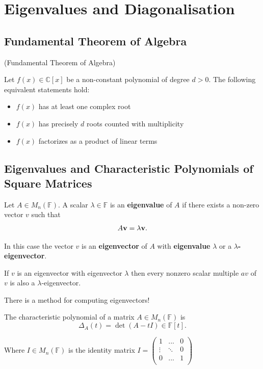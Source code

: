 \section{Eigenvalues and Diagonalisation}

\subsection{Fundamental Theorem of Algebra}
\begin{theorem} (Fundamental Theorem of Algebra)

  Let $f(x) \in \mathbb{C}[x]$ be a non-constant polynomial of degree $d > 0$. The following equivalent statements hold:
  \begin{itemize}
    \item $f(x)$ has at least one complex root
    \item $f(x)$ has precisely $d$ roots counted with multiplicity
    \item $f(x)$ factorizes as a product of linear terms
  \end{itemize}
\end{theorem}

\subsection{Eigenvalues and Characteristic Polynomials of Square Matrices}

\begin{definition}
  Let $A \in M_n(\mathbb{F})$. A scalar $\lambda \in \mathbb{F}$ is an {\bf eigenvalue} of $A$ if there exists a non-zero vector $v$ such that
  \[A {\bf v} = \lambda {\bf v}.\]

In this case the vector $v$ is an {\bf eigenvector} of $A$ with {\bf eigenvalue} $\lambda$ or a {\bf $\lambda$-eigenvector}.
\end{definition}

\begin{remark}
    If $v$ is an eigenvector with eigenvector $\lambda$ then every nonzero scalar multiple $a v$ of $v$ is also a $\lambda$-eigenvector.
\end{remark}

There is a method for computing eigenvectors!

\begin{definition}
    The characteristic polynomial of a matrix $A \in M_n(\mathbb{F})$ is 
    \[\Delta_A(t) = \det (A - tI) \in \mathbb{F}[t].\]

    Where $I \in M_n(\mathbb{F})$ is the identity matrix $I = \begin{pmatrix}
    1 & ... & 0\\
    \vdots & \ddots & 0\\
    0 & ... & 1\\
    \end{pmatrix}$
\end{definition}

